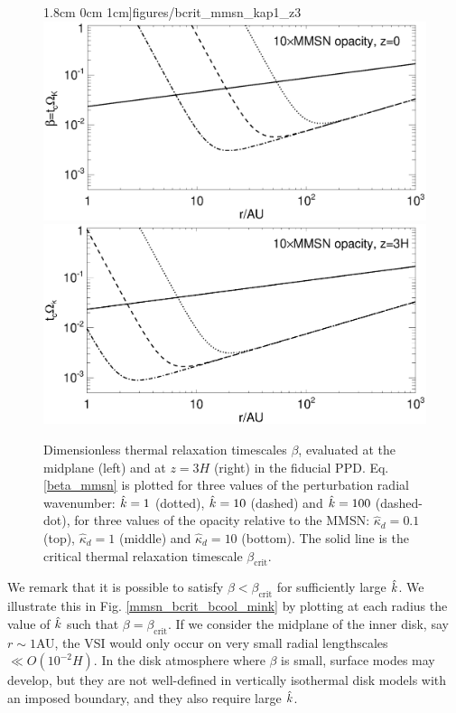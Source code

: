 \begin{figure}
  1.8cm 0cm 1cm]{figures/bcrit_mmsn_kap1_z3}\\
  \includegraphics[scale=.47,clip=true,trim=0cm 0cm 0cm
  1cm]{figures/bcrit_mmsn_kap10_z0}\includegraphics[scale=.47,clip=true,trim=2.5cm 0cm 0cm
  1cm]{figures/bcrit_mmsn_kap10_z3} 
  \caption{Dimensionless thermal relaxation timescales $\beta$,
    evaluated at the midplane (left) and at $z=3H$ (right) in the
    fiducial PPD. Eq. \ref{beta_mmsn} is plotted  
    for three values of the 
    perturbation radial wavenumber: $\hat{k}=1$ (dotted), $\hat{k}=10$
    (dashed) and $\hat{k}=100$ (dashed-dot), for three values of the
    opacity relative to the MMSN: $\hat{\kappa}_d=0.1$ (top),
    $\hat{\kappa}_d=1$ (middle) and $\hat{\kappa}_d=10$ (bottom).  
    The solid line is the 
    critical thermal relaxation timescale $\beta_\mathrm{crit}$.  
    \label{mmsn_bcrit_bcool}}   
\end{figure}  

We remark that it is possible to satisfy $\beta < \beta_\mathrm{crit}$ 
for sufficiently large $\hat{k}$. We illustrate this in 
Fig. \ref{mmsn_bcrit_bcool_mink} by plotting at each radius the value
of $\hat{k}$ such that $\beta = \beta_\mathrm{crit}$. If we consider the
midplane of the inner disk, say $r\sim 1$AU, the VSI would only occur
on very small radial lengthscales $\ll O(10^{-2}H)$. In the disk
atmosphere where $\beta$ is small, surface modes may develop, 
but they are not well-defined in vertically isothermal disk models
with an imposed boundary, and they also require large $\hat{k}$.    

